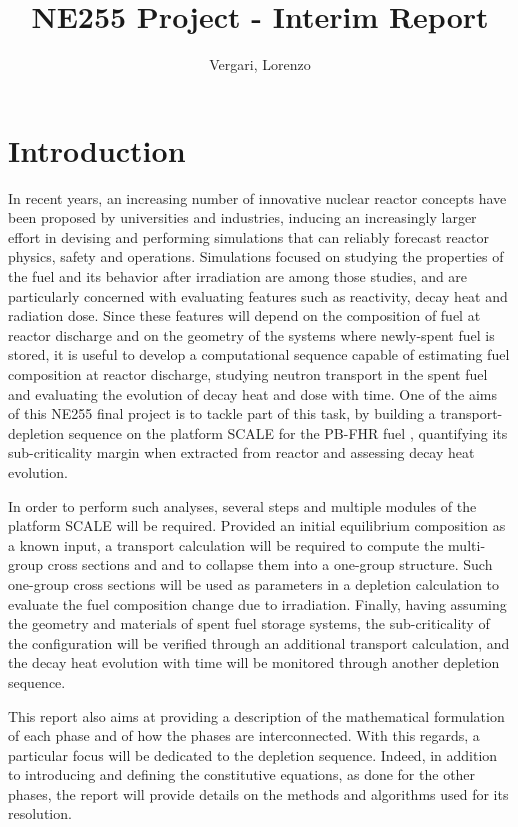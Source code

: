\documentclass[a4paper,titlepage]{article}
\title{NE255 Project - Interim Report}
\author{Vergari, Lorenzo}
\begin{document}
\maketitle

\section{Introduction}
\label{S:0}
In recent years, an increasing number of innovative nuclear reactor concepts have been proposed by universities and industries, inducing an increasingly larger effort in devising and performing simulations that can reliably forecast reactor physics, safety and operations. Simulations focused on studying the properties of the fuel and its behavior after irradiation are among those studies, and are particularly concerned with evaluating features such as reactivity, decay heat and radiation dose.
Since these features will depend on the composition of fuel at reactor discharge and on the geometry of the systems where newly-spent fuel is stored, it is useful to develop a computational sequence capable of estimating fuel composition at reactor discharge, studying neutron transport in the spent fuel and evaluating the evolution of decay heat and dose with time.
One of the aims of this NE255 final project is to tackle part of this task, by building a transport-depletion sequence on the platform SCALE \cite{rearden2016scale} for the PB-FHR fuel \cite{cisneros2013pebble} , quantifying its sub-criticality margin when extracted from reactor and assessing decay heat evolution.

In order to perform such analyses, several steps and multiple modules of the platform SCALE will be required. 
Provided an initial equilibrium composition as a known input, a transport calculation will be required to compute the multi-group cross sections and and to collapse them into a one-group structure. Such one-group cross sections will be used as parameters in a depletion calculation to evaluate the fuel composition change due to irradiation. Finally, having assuming the geometry and materials of spent fuel storage systems, the sub-criticality of the configuration will be verified through an additional transport calculation, and the decay heat evolution with time will be monitored through another depletion sequence.

This report also aims at providing a description of the mathematical formulation of each phase and of how the phases are interconnected. With this regards, a particular focus will be dedicated to the depletion sequence. Indeed, in addition to introducing and defining the constitutive equations, as done for the other phases, the report will provide details on the methods and algorithms used for its resolution.
\end{document}
